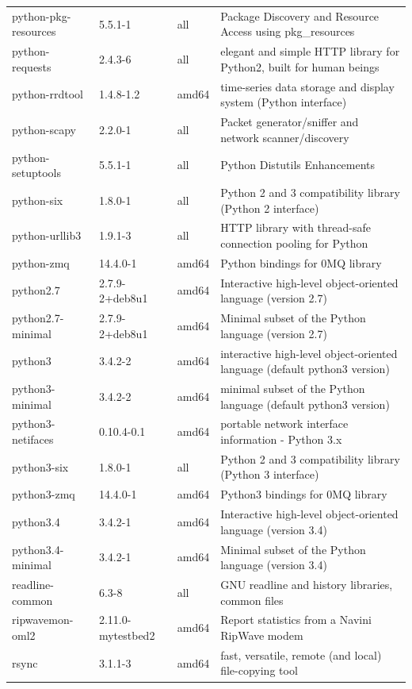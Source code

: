 \documentclass[a4paper,10pt]{article}
\begin{document}
\begin{appendices}
{\begin{longtable}{p{3.25cm}@{\hspace{0.25cm}}p{4cm}@{\hspace{0.25cm}}l@{\hspace{0.25cm}}p{7cm}}
python-pkg-resources	&	5.5.1-1	&	all	&	Package Discovery and Resource Access using pkg\_resources	\\
python-requests	&	2.4.3-6	&	all	&	elegant and simple HTTP library for Python2, built for human beings	\\
python-rrdtool	&	1.4.8-1.2	&	amd64	&	time-series data storage and display system (Python interface)	\\
python-scapy	&	2.2.0-1	&	all	&	Packet generator/sniffer and network scanner/discovery	\\
python-setuptools	&	5.5.1-1	&	all	&	Python Distutils Enhancements	\\
python-six	&	1.8.0-1	&	all	&	Python 2 and 3 compatibility library (Python 2 interface)	\\
python-urllib3	&	1.9.1-3	&	all	&	HTTP library with thread-safe connection pooling for Python	\\
python-zmq	&	14.4.0-1	&	amd64	&	Python bindings for 0MQ library	\\
python2.7	&	2.7.9-2+deb8u1	&	amd64	&	Interactive high-level object-oriented language (version 2.7)	\\
python2.7-minimal	&	2.7.9-2+deb8u1	&	amd64	&	Minimal subset of the Python language (version 2.7)	\\
python3	&	3.4.2-2	&	amd64	&	interactive high-level object-oriented language (default python3 version)	\\
python3-minimal	&	3.4.2-2	&	amd64	&	minimal subset of the Python language (default python3 version)	\\
python3-netifaces	&	0.10.4-0.1	&	amd64	&	portable network interface information - Python 3.x	\\
python3-six	&	1.8.0-1	&	all	&	Python 2 and 3 compatibility library (Python 3 interface)	\\
python3-zmq	&	14.4.0-1	&	amd64	&	Python3 bindings for 0MQ library	\\
python3.4	&	3.4.2-1	&	amd64	&	Interactive high-level object-oriented language (version 3.4)	\\
python3.4-minimal	&	3.4.2-1	&	amd64	&	Minimal subset of the Python language (version 3.4)	\\
readline-common	&	6.3-8	&	all	&	GNU readline and history libraries, common files	\\
ripwavemon-oml2	&	2.11.0-mytestbed2	&	amd64	&	Report statistics from a Navini RipWave modem	\\
rsync	&	3.1.1-3	&	amd64	&	fast, versatile, remote (and local) file-copying tool	\\

\end{longtable}}
\end{appendices}
\end{document}

